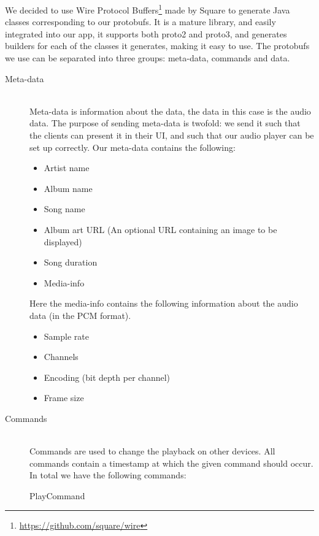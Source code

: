 We decided to use Wire Protocol Buffers\footnote{\url{https://github.com/square/wire}} made by Square to generate Java classes corresponding to our protobufs.
It is a mature library, and easily integrated into our app, it supports both proto2 and proto3, and generates builders for each of the classes it generates, making it easy to use.
The protobufs we use can be separated into three groups: meta-data, commands and data. 
\begin{description}
    \item[Meta-data] \hfill \\
        Meta-data is information about the data, the data in this case is the audio data.
        The purpose of sending meta-data is twofold: we send it such that the clients can present it in their UI, and such that our audio player can be set up correctly.
        Our meta-data contains the following:
        \begin{itemize}
            \item Artist name
            \item Album name
            \item Song name
            \item Album art URL (An optional URL containing an image to be displayed)
            \item Song duration
            \item Media-info
        \end{itemize}
        Here the media-info contains the following information about the audio data (in the \ac{PCM} format). 
        \begin{itemize}
            \item Sample rate
            \item Channels
            \item Encoding (bit depth per channel)
            \item Frame size
        \end{itemize}
    \item[Commands] \hfill \\
        Commands are used to change the playback on other devices.
        All commands contain a timestamp at which the given command should occur. 
        In total we have the following commands:
        \begin{description}
            \item[PlayCommand]

\end{description}
\end{description}

